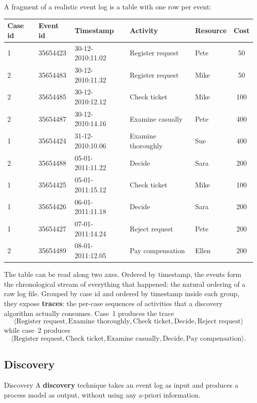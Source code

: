 A fragment of a realistic event log is a table with one row per event:
\begin{center}
\small
\begin{tabular}{lllllc}
\toprule
\textbf{Case id} & \textbf{Event id} & \textbf{Timestamp} & \textbf{Activity} & \textbf{Resource} & \textbf{Cost} \\
\midrule
1 & 35654423 & 30-12-2010:11.02 & Register request & Pete  &  50 \\
2 & 35654483 & 30-12-2010:11.32 & Register request & Mike  &  50 \\
2 & 35654485 & 30-12-2010:12.12 & Check ticket     & Mike  & 100 \\
2 & 35654487 & 30-12-2010:14.16 & Examine casually & Pete  & 400 \\
1 & 35654424 & 31-12-2010:10.06 & Examine thoroughly & Sue & 400 \\
2 & 35654488 & 05-01-2011:11.22 & Decide           & Sara  & 200 \\
1 & 35654425 & 05-01-2011:15.12 & Check ticket     & Mike  & 100 \\
1 & 35654426 & 06-01-2011:11.18 & Decide           & Sara  & 200 \\
1 & 35654427 & 07-01-2011:14.24 & Reject request   & Pete  & 200 \\
2 & 35654489 & 08-01-2011:12.05 & Pay compensation & Ellen & 200 \\
\bottomrule
\end{tabular}
\end{center}
The table can be read along two axes. Ordered by timestamp, the events form the chronological stream of everything that happened: the natural ordering of a raw log file. Grouped by case id and ordered by timestamp inside each group, they expose \textbf{traces}: the per-case sequences of activities that a discovery algorithm actually consumes. Case~1 produces the trace
\[
  \langle \text{Register request}, \text{Examine thoroughly}, \text{Check ticket}, \text{Decide}, \text{Reject request} \rangle
\]
while case~2 produces
\[
  \langle \text{Register request}, \text{Check ticket}, \text{Examine casually}, \text{Decide}, \text{Pay compensation} \rangle.
\]

\subsection{Discovery}

\begin{definitionbox}{Discovery}
A \textbf{discovery} technique takes an event log as input and produces a process model as output, without using any a-priori information.
\end{definitionbox}

